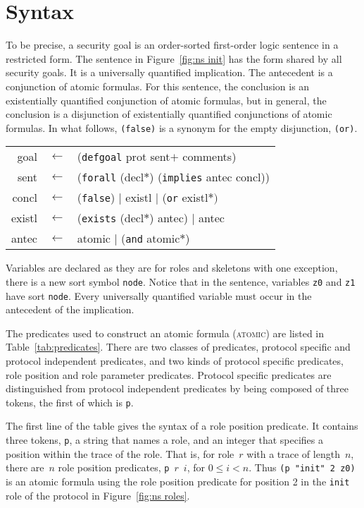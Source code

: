 \documentclass[12pt]{article}
\newcommand{\sym}[1]{\textup{\texttt{#1}}}
\begin{document}
\section{Syntax}\label{sec:syntax}

To be precise, a security goal is an order-sorted first-order logic
sentence in a restricted form.  The sentence in Figure~\ref{fig:ns
  init} has the form shared by all security goals.  It is a
universally quantified implication.  The antecedent is a conjunction
of atomic formulas.  For this sentence, the conclusion is an
existentially quantified conjunction of atomic formulas, but in
general, the conclusion is a disjunction of existentially quantified
conjunctions of atomic formulas.  In what follows, \sym{(false)} is a
synonym for the empty disjunction, \sym{(or)}.

\begin{center}\scshape
  \begin{tabular}{rcl}
  goal&$\leftarrow$&(\sym{defgoal} prot sent$+$ comments)
  \\ sent&$\leftarrow$&(\sym{forall} (decl$\ast$) (\sym{implies} antec concl))
  \\ concl&$\leftarrow$&(\sym{false})
  $\mid$ existl $\mid$ (\sym{or} existl$\ast)$
  \\ existl&$\leftarrow$&(\sym{exists}
  (decl$\ast$) antec) $\mid$ antec
  \\ antec&$\leftarrow$&atomic $\mid$ (\sym{and} atomic$\ast$)
  \end{tabular}
\end{center}

Variables are declared as they are for roles and skeletons with one
exception, there is a new sort symbol \sym{node}.  Notice that in the
sentence, variables \sym{z0} and \sym{z1} have sort \sym{node}.  Every
universally quantified variable must occur in the antecedent of the
implication.

The predicates used to construct an atomic formula (\textsc{atomic})
are listed in Table~\ref{tab:predicates}.  There are two classes of
predicates, protocol specific and protocol independent predicates, and
two kinds of protocol specific predicates, role position and role
parameter predicates.  Protocol specific predicates are distinguished
from protocol independent predicates by being composed of three
tokens, the first of which is \texttt{p}.

The first line of the table gives the syntax of a role position
predicate.  It contains three tokens, \texttt{p}, a string that names
a role, and an integer that specifies a position within the trace of
the role.  That is, for role~$r$ with a trace of length~$n$, there
are~$n$ role position predicates, \mbox{\texttt{p} $r$ $i$}, for
$0\leq i < n$.  Thus \verb|(p "init" 2 z0)| is an atomic formula using
the role position predicate for position 2 in the \texttt{init} role
of the protocol in Figure~\ref{fig:ns roles}.
\end{document}
